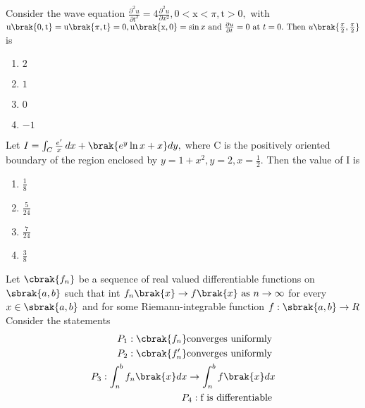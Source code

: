 \iffalse
\chapter{2010}
\author{AI24BTECH11032}
\section{ma}
\fi

\item Consider the wave equation $\frac{\partial^{2}u}{\partial t^{2}}=4\frac{\partial^{2}u}{\partial x^{2}},0<\text{x}<\pi,\text{t}>0,$ with $\text{u}\brak{0,\text{t}}=\text{u}\brak{\pi,\text{t}}=0,\text{u}\brak{\text{x},0}=\sin x \text{ and }\frac{\partial u}{\partial t}=0 \text{ at } t=0.\text{ Then } u\brak{\frac{\pi}{2},\frac{\pi}{2}}$ is
\begin{multicols}{4}
    \begin{enumerate}
        \item $2$
        \item $1$
        \item $0$
        \item $-1$
    \end{enumerate}
\end{multicols}
\bigskip
\item Let $I=\int_ {C} \frac{e^{\prime}}{x} \, dx + \brak{e^{y}\ln x +x}dy,$ where C is the positively oriented  boundary of the region enclosed by $y=1+x^{2},y=2,x=\frac{1}{2}.$ Then the value of I is 
\begin{multicols}{4}
    \begin{enumerate}
        \item $\frac{1}{8}$
        \item $\frac{5}{24}$
        \item $\frac{7}{24}$
        \item $\frac{3}{8}$
    \end{enumerate}
\end{multicols}
\bigskip
\item Let $\cbrak{f_{n}}$ be a sequence of real valued differentiable functions on $\sbrak{a,b}$ such that int $f_{n}\brak{x}\to f\brak{x} \text{ as } n \to \infty$ for every $x \in \sbrak{a, b}$ and for some Riemann-integrable function $f : \sbrak{a, b} \to R$ Consider the statements
\begin{align*}
    P_{1}:\cbrak{f_{n}} \text{converges uniformly }\\
     P_{2}:\cbrak{f_{n}^{\prime}} \text{converges uniformly }\\
    P_{3}: \int_{n}^{b} f_{n}\brak{x}dx \to \int_{n}^{b} f\brak{x}dx\\
    P_{4}:\text{f is differentiable }
\end{align*}
